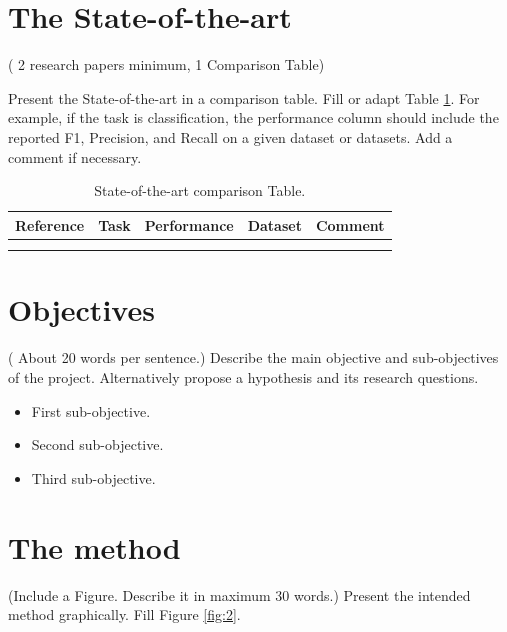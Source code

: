 \documentclass[11pt,a4paper]{article}
\begin{document}
\section{The State-of-the-art}
({\color{blue} 2 research papers minimum, 1 Comparison Table}) %

Present the State-of-the-art in a comparison table. Fill or adapt Table \ref{table:1}. For example, if the task is classification, the performance column should include the reported F1, Precision, and Recall on a given dataset or datasets. Add a comment if necessary. 


\begin{table}[h!]
\centering
\begin{tabular}{|l|l|l|l|l|}
\hline
\textbf{Reference} & \textbf{Task} & \textbf{Performance} & \textbf{Dataset} & \textbf{Comment} \\ \hline
                   &               &                      &                  &                  \\ \hline
                   &               &                      &                  &                  \\ \hline
\end{tabular}
\caption{State-of-the-art comparison Table.}
\label{table:1}

\end{table}

\section{Objectives}
({\color{blue} About 20 words per sentence.}) Describe the main objective and sub-objectives of the project. Alternatively propose a hypothesis and its research questions. 

\begin{itemize}
\item First sub-objective.
\item Second sub-objective.
\item Third sub-objective.
\end{itemize}

\section{The method}
({\color{blue}Include a Figure. Describe it in maximum 30 words.}) Present the intended method graphically. Fill Figure \ref{fig:2}. 
\end{document}
